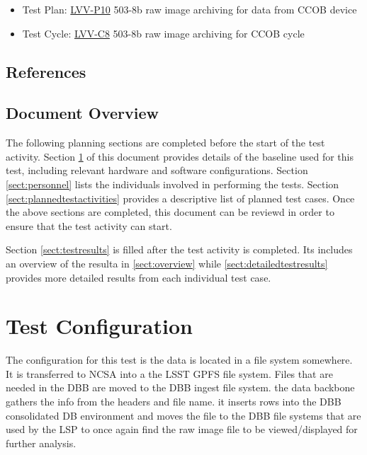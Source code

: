 \documentclass[DM,lsstdraft,STR,toc]{lsstdoc}
\begin{document}
\begin{itemize}
\item Test Plan: \href{https://jira.lsstcorp.org/secure/Tests.jspa\#/testPlan/LVV-P10}{LVV-P10} 503-8b raw image archiving for data from CCOB device 
\item Test Cycle: \href{https://jira.lsstcorp.org/secure/Tests.jspa\#/testCycle/LVV-C8}{LVV-C8} 503-8b raw image archiving for CCOB cycle
\end{itemize}

 
\subsection{References}
\label{sect:references}

\renewcommand{\refname}{}


\subsection{Document Overview}
\label{sect:docoverview}

The following planning sections are completed before the start of the test activity.
Section \ref{sect:configuration} of this document provides details of the \product{} baseline used for this test, including relevant hardware and software configurations.
Section \ref{sect:personnel} lists the individuals involved in performing the tests.
Section \ref{sect:plannedtestactivities} provides a descriptive list of planned test cases.
Once the above sections are completed, this document can be reviewd in order to ensure that the test activity can start.

Section \ref{sect:testresults} is filled after the test activity is completed. 
Its includes  an overview of the resulta in \ref{sect:overview}
while \ref{sect:detailedtestresults} provides more detailed results from each individual test case.

\section{Test Configuration}
\label{sect:configuration}

The configuration for this test is the data is located in a file system somewhere.  It is transferred to NCSA into a the LSST GPFS file system.   Files that are needed in the DBB are moved to the DBB ingest file system.   the data backbone gathers the info from the headers and file name.  it inserts rows into the DBB consolidated DB environment and moves the file to the DBB file systems that are used by the LSP to once again find the raw image file to be viewed/displayed for further analysis.  
\end{document}
